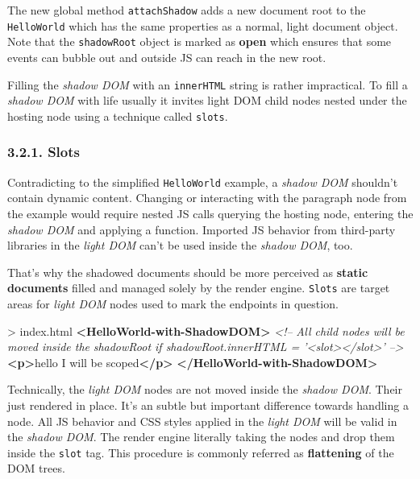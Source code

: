 \documentclass[]{article}
\newenvironment{Shaded}{}{}
\newcommand{\KeywordTok}[1]{\textcolor[rgb]{0.00,0.44,0.13}{\textbf{{#1}}}}
\newcommand{\CommentTok}[1]{\textcolor[rgb]{0.38,0.63,0.69}{\textit{{#1}}}}
\newcommand{\NormalTok}[1]{{#1}}
\begin{document}
The new global method \texttt{attachShadow} adds a new document root to
the \texttt{HelloWorld} which has the same properties as a normal, light
document object. Note that the \texttt{shadowRoot} object is marked as
\textbf{open} which ensures that some events can bubble out and outside
JS can reach in the new root.

Filling the \emph{shadow DOM} with an \texttt{innerHTML} string is
rather impractical. To fill a \emph{shadow DOM} with life usually it
invites light DOM child nodes nested under the hosting node using a
technique called \texttt{slots}.

\subsubsection{3.2.1. Slots}\label{slots}

Contradicting to the simplified \texttt{HelloWorld} example, a
\emph{shadow DOM} shouldn't contain dynamic content. Changing or
interacting with the paragraph node from the example would require
nested JS calls querying the hosting node, entering the \emph{shadow
DOM} and applying a function. Imported JS behavior from third-party
libraries in the \emph{light DOM} can't be used inside the \emph{shadow
DOM}, too.

That's why the shadowed documents should be more perceived as
\textbf{static documents} filled and managed solely by the render
engine. \texttt{Slots} are target areas for \emph{light DOM} nodes used
to mark the endpoints in question.

\begin{Shaded}
\begin{Highlighting}[]
\NormalTok{> index.html}
\KeywordTok{<HelloWorld-with-ShadowDOM>}
  \CommentTok{<!--}
\CommentTok{    All child nodes will be moved inside the}
\CommentTok{    shadowRoot if shadowRoot.innerHTML = '<slot></slot>'}
\CommentTok{    -->}
  \KeywordTok{<p>}\NormalTok{hello I will be scoped}\KeywordTok{</p>}
\KeywordTok{</HelloWorld-with-ShadowDOM>}
\end{Highlighting}
\end{Shaded}

Technically, the \emph{light DOM} nodes are not moved inside the
\emph{shadow DOM}. Their just rendered in place. It's an subtle but
important difference towards handling a node. All JS behavior and CSS
styles applied in the \emph{light DOM} will be valid in the \emph{shadow
DOM}. The render engine literally taking the nodes and drop them inside
the \texttt{slot} tag. This procedure is commonly referred as
\textbf{flattening} of the DOM trees.
\end{document}
